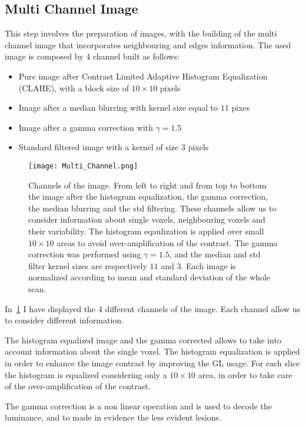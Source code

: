 \documentclass{standalone}
\begin{document}
	\subsection*{Multi Channel Image}
	
		This step involves the preparation of images, with the building of the multi channel image that incorporates neighbouring and edges information. 
		The used image is composed by 4 channel built as follows:  
		\begin{itemize}
			\item Pure image after Contrast Limited Adaptive Histogram Equalization (CLAHE), with a block size of  $10\times 10$ pixels
			\item Image after a median blurring with kernel size equal to $11$ pixes
			\item Image after a gamma correction with $\gamma = 1.5$
			\item Standard filtered image with a kernel of size $3$ pixels
		\end{itemize}
	
		\begin{figure}[h]
			\centering
				\texttt{[image: Multi\_Channel.png]}
			\caption{Channels of the image. From left to right and from top to bottom the image after the histogram equalization, the gamma correction, the median blurring and the std filtering. These channels allow us to consider information about single voxels, neighbouring voxels and their variability. The histogram eqaulization is applied over small $10\times 10$ areas to avoid  over-amplification of the contrast. The gamma correction was performed using $\gamma = 1.5$, and the median and std filter kernel sizes are respectively $11$ and $3$. Each image is normalized according to mean and standard deviation of the whole scan. }\label{fig:MultiChannel}
		\end{figure}
	
		In \figurename\,\ref{fig:MultiChannel} I have displayed the 4 different channels of the image. Each channel allow us to consider different information.
		
		The histogram equalized image and the gamma corrected allows to take into account information about the single voxel. The histogram equalization is applied in order to enhance the image contrast by improving the GL usage. For each slice the histogram is equalized considering only a $10\times 10$ area, in order to take care of the over-amplification of the contrast.
		
		The gamma correction is a non linear operation and is used to decode the luminance, and to made in evidence the less evident lesions. 
		
\end{document}
